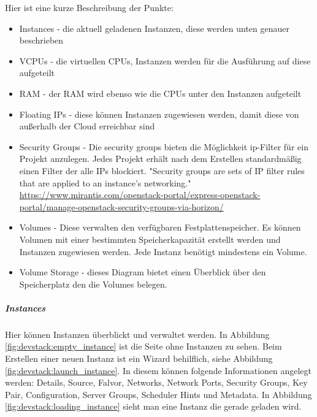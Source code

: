 \documentclass[a4paper,10pt]{article}
\begin{document}
\begin{minipage}{\textwidth}
Hier ist eine kurze Beschreibung der Punkte:
\begin{itemize}
 \item Instances - die aktuell geladenen Instanzen, diese werden unten genauer beschrieben
 \item VCPUs - die virtuellen CPUs, Instanzen werden für die Ausführung auf diese aufgeteilt
 \item RAM - der RAM wird ebenso wie die CPUs unter den Instanzen aufgeteilt
 \item Floating IPs - diese können Instanzen zugewiesen werden, damit diese von außerhalb der Cloud erreichbar sind
 \item Security Groups - Die security groups bieten die Möglichkeit ip-Filter für ein Projekt anzulegen. Jedes Projekt erhält nach dem Erstellen standardmäßig einen Filter der alle IPs blockiert. "Security groups are sets of IP filter rules that are applied to an instance’s networking." \url{https://www.mirantis.com/openstack-portal/express-openstack-portal/manage-openstack-security-groups-via-horizon/}
 \item Volumes - Diese verwalten den verfügbaren Festplattenspeicher. Es können Volumen mit einer bestimmten Speicherkapazität erstellt werden und Instanzen zugewiesen werden. Jede Instanz benötigt mindestens ein Volume.
 \item Volume Storage - dieses Diagram bietet einen Überblick über den Speicherplatz den die Volumes belegen.
\end{itemize}
\end{minipage}

\subparagraph{Instances}

Hier können Instanzen überblickt und verwaltet werden.
In Abbildung \ref{fig:devstack:empty_instance} ist die Seite ohne Instanzen zu sehen.
Beim Erstellen einer neuen Instanz ist ein Wizard behilflich, siehe Abbildung \ref{fig:devstack:launch_instance}.
In diesem können folgende Informationen angelegt werden: Details, Source, Falvor, Networks, Network Ports, Security Groups, Key Pair, Configuration, Server Groups, Scheduler Hints und Metadata.
In Abbildung \ref{fig:devstack:loading_instance} sieht man eine Instanz die gerade geladen wird.
\end{document}
